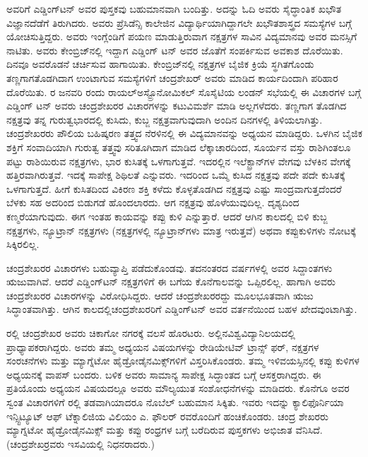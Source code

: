 ಅವರಿಗೆ ಎಡ್ಡಿಂಗ್‍ಟನ್ ಅವರ ಪುಸ್ತಕವು ಬಹುಮಾನವಾಗಿ ಬಂದಿತ್ತು. ಅದನ್ನು ಓದಿ ಅವರು ಸೈದ್ಧಾಂತಿಕ ಖಭೌತ ವಿಜ್ಞಾನದೆಡೆಗೆ ತಿರುಗಿದರು. ಅವರು ಪ್ರೆಸಿಡೆನ್ಸಿ ಕಾಲೇಜಿನ ವಿದ್ಯಾರ್ಥಿಯಾಗಿ\-ದ್ದಾಗಲೇ ಖಭೌತಶಾಸ್ತ್ರದ ಸಮಸ್ಯೆಗಳ ಬಗ್ಗೆ ಯೋಚಿಸುತ್ತಿದ್ದರು. ಅವರು ಇಂಗ್ಲೆಂಡಿಗೆ ಪಯಣ ಮಾಡುತ್ತಿರುವಾಗ ನಕ್ಷತ್ರಗಳ ಸಾವಿನ ವಿದ್ಯಮಾನವು ಅವರ ಮನಸ್ಸಿಗೆ ನಾಟಿತು. ಅವರು ಕೇಂಬ್ರಿಜ್‍ನಲ್ಲಿ ಇದ್ದಾಗ ಎಡ್ಡಿಂಗ್ ಟನ್ ಅವರ ಜೊತೆಗೆ ಸಂಪರ್ಕಿಸುವ ಅವಕಾಶ ದೊರೆಯಿತು. ದಿನವೂ ಅವರೊಡನೆ ಚರ್ಚಿಸುವ ಹಾಗಾಯಿತು. ಕೇಂಬ್ರಿಜ್‍ನಲ್ಲಿ ನಕ್ಷತ್ರಗಳ ಬೈಜಿಕ ಕ್ರಿಯೆ ಸ್ಥಗಿತಗೊಂಡು ತಣ್ಣಗಾಗತೊಡಗಿದಾಗ ಉಂಟಾಗುವ ಸಮಸ್ಯೆಗಳಿಗೆ ಚಂದ್ರಶೇಖರ್ ಅವರು ಮಾಡಿದ ಕಾರ್ಯದಿಂದಾಗಿ ಪರಿಹಾರ ದೊರೆಯಿತು. ರ ಜನವರಿ ರಂದು ರಾಯಲ್\break ಅಸ್ಟ್ರೊನೋಮಿಕಲ್ ಸೊಸೈಟಿಯ ಲಂಡನ್ ಸಭೆಯಲ್ಲಿ ಈ ವಿಚಾರಗಳ ಬಗ್ಗೆ ಎಡ್ಡಿಂಗ್ ಟನ್ ಅವರು ಚಂದ್ರಶೇಖರರ ವಿಚಾರಗಳನ್ನು ಕಟುವಿಮರ್ಶೆ ಮಾಡಿ ಅಲ್ಲಗಳೆದರು. ತಣ್ಣಗಾಗ ತೊಡಗಿದ ನಕ್ಷತ್ರವು ತನ್ನ ಗುರುತ್ವಭಾರದಲ್ಲಿ ಕುಸಿದು, ಕುಬ್ಜ ನಕ್ಷತ್ರವಾಗುವುದಾಗಿ ಅಂದಿನ ದಿನಗಳಲ್ಲಿ ತಿಳಿಯಲಾಗಿತ್ತು. ಚಂದ್ರಶೇಖರರು ಪೌಲಿಯ ಬಹಿಷ್ಕರಣ ತತ್ತ್ವದ ನೆರಳಿನಲ್ಲಿ ಈ ವಿದ್ಯಮಾನವನ್ನು ಅಧ್ಯಯನ ಮಾಡಿದ್ದರು. ಒಳಗಿನ ಬೈಜಿಕ ಶಕ್ತಿಗೆ ಸಂವಾದಿಯಾಗಿ ಗುರುತ್ವ ತತ್ತ್ವವು ಸರಿತೂಗಿದಾಗ ಮಾಡಿದ ಲೆಕ್ಕಾಚಾರದಿಂದ, ಸೂರ್ಯನ ವಸ್ತು ರಾಶಿಗಿಂತಲೂ  ಪಟ್ಟು ರಾಶಿಯಿರುವ ನಕ್ಷತ್ರಗಳು, ಭಾರ ಕುಸಿತಕ್ಕೆ ಒಳಗಾಗುತ್ತವೆ. ಇದರಲ್ಲಿನ ಇಲೆಕ್ಟ್ರಾನ್‍ಗಳ ವೇಗವು ಬೆಳಕಿನ ವೇಗಕ್ಕೆ ಹತ್ತಿರವಾಗಿರುತ್ತವೆ. ಇದಕ್ಕೆ ಸಾಪೇಕ್ಷ ಶಿಥಿಲತೆ ಎನ್ನುವರು. ಇದರಿಂದ ಒಮ್ಮೆ ಕುಸಿದ ನಕ್ಷತ್ರವು ಪದೇ ಪದೇ ಕುಸಿತಕ್ಕೆ ಒಳಗಾಗುತ್ತದೆ. ಹೀಗೆ ಕುಸಿತದಿಂದ ವಿಕಿರಣ ಶಕ್ತಿ ಕಳೆದು ಕೊಳ್ಳತೊಡಗಿದ ನಕ್ಷತ್ರವು ಎಷ್ಟು ಸಾಂದ್ರವಾಗುತ್ತದೆಂದರೆ ಬೆಳಕು ಸಹ ಅದರಿಂದ ಬಿಡುಗಡೆ ಹೊಂದಲಾರದು. ಆಗ ನಕ್ಷತ್ರವು ಹೊಳೆಯುವುದಿಲ್ಲ. ದೃಶ್ಯದಿಂದ ಕಣ್ಮರೆಯಾಗುವುದು. ಈಗ ಇಂತಹ ಕಾಯವನ್ನು ಕಪ್ಪು ಕುಳಿ ಎನ್ನುತ್ತಾರೆ. ಆದರೆ ಆಗಿನ ಕಾಲದಲ್ಲಿ ಬಿಳಿ ಕುಬ್ಜ ನಕ್ಷತ್ರಗಳು, ನ್ಯೂಟ್ರಾನ್ ನಕ್ಷತ್ರಗಳು (ನಕ್ಷತ್ರಗಳಲ್ಲಿ ನ್ಯೂಟ್ರಾನ್‍ಗಳು ಮಾತ್ರ ಇರುತ್ತವೆ) ಅಥವಾ ಕಪ್ಪುಕುಳಿಗಳು ನೋಟಕ್ಕೆ ಸಿಕ್ಕಿರಲಿಲ್ಲ.

ಚಂದ್ರಶೇಖರರ ವಿಚಾರಗಳು ಬಹುವ್ಯಾಪ್ತಿ ಪಡೆದುಕೊಂಡವು. ತದನಂತರದ ವರ್ಷಗಳಲ್ಲಿ ಅವರ ಸಿದ್ದಾಂತಗಳು ಋಜುವಾಗಿವೆ. ಆದರೆ ಎಡ್ಡಿಂಗ್‍ಟನ್ ನಕ್ಷತ್ರಗಳಿಗೆ ಈ ಬಗೆಯ ಕೊನೆಗಾಲವನ್ನು ಒಪ್ಪಿರಲಿಲ್ಲ. ಹಾಗಾಗಿ ಅವರು ಚಂದ್ರಶೇಖರರ ವಿಚಾರಗಳನ್ನು ವಿರೋಧಿಸಿದ್ದರು. ಆದರೆ ಚಂದ್ರಶೇಖರರದ್ದು ಮೂಲಭೂತವಾಗಿ ಋಜು ಸಿದ್ಧಾಂತವಾಗಿತ್ತು. ಆಗಿನ ಕಾಲದಲ್ಲಿ\break ಚಂದ್ರಶೇಖರರಿಗೆ ಎಡ್ಡಿಂಗ್‍ಟನ್ ಅವರ ವರ್ತನೆಯಿಂದ ಬಹಳ ಖೇದವುಂಟಾಗಿತ್ತು.

ರಲ್ಲಿ ಚಂದ್ರಶೇಖರ ಅವರು ಚಿಕಾಗೋ ನಗರಕ್ಕೆ ವಲಸೆ ಹೊರಟರು. ಅಲ್ಲಿನ\break ವಿಶ್ವವಿದ್ಯಾನಿಲಯದಲ್ಲಿ ಪ್ರಾಧ್ಯಾಪಕರಾಗಿದ್ದರು. ಅವರು ತಮ್ಮ ಅಧ್ಯಯನ ವಿಷಯಗಳನ್ನು ರೇಡಿಯೇಟಿವ್ ಟ್ರಾನ್ಸ್ ಫರ್, ನಕ್ಷತ್ರಗಳ ಸಂರಚನೆಗಳು ಮತ್ತು ಮ್ಯಾಗ್ನೆಟೋ ಹೈಡ್ರೋಡೈನಮಿಕ್ಸ್‌ಗಳಿಗೆ ವಿಸ್ತರಿಸಿಕೊಂಡರು. ತಮ್ಮ ಇಳಿವಯಸ್ಸಿನಲ್ಲಿ ಕಪ್ಪು ಕುಳಿಗಳ ಅಧ್ಯಯನಕ್ಕೆ ವಾಪಸ್ ಬಂದರು. ಬಳಿಕ ಅವರು ಸಾಮಾನ್ಯ ಸಾಪೇಕ್ಷ ಸಿದ್ಧಾಂತದ ಬಗ್ಗೆ ಆಸಕ್ತರಾಗಿದ್ದರು. ಈ ಪ್ರತಿಯೊಂದು ಅಧ್ಯಯನ ವಿಷಯದಲ್ಲೂ ಅವರು ಮೌಲ್ಯಯುತ ಸಂಶೋಧನೆಗಳನ್ನು ಮಾಡಿದರು. ಕೊನೆಗೂ ಅವರ ಸ್ವಂತ ವಿಚಾರಗಳಿಗೆ ರಲ್ಲಿ ತಡವಾಗಿಯಾದರೂ ನೊಬೆಲ್ ಬಹುಮಾನ ಸಿಕ್ಕಿತು. ಇವರು ಇದನ್ನು ಕ್ಯಾಲಿಫೊರ್ನಿಯಾ ಇನ್ಸ್ಟಿಟ್ಯೂಟ್ ಆಫ್ ಟೆಕ್ನಾಲಿಜಿಯ ವಿಲಿಯಂ ಎ. ಫೌಲರ್ ರವರೊಂದಿಗೆ ಹಂಚಿಕೊಂಡರು. ಚಂದ್ರ ಶೇಖರರು ಮ್ಯಾಗ್ನಟೋ ಹೈಡ್ರೋಡೈನಮಿಕ್ಸ್ ಮತ್ತು ಕಪ್ಪು ರಂಧ್ರಗಳ ಬಗ್ಗೆ ಬರೆದಿರುವ ಪುಸ್ತಕಗಳು ಅಭಿಜಾತ ವೆನಿಸಿದೆ. (ಚಂದ್ರಶೇಖರ್‍ರವರು  ಇಸವಿಯಲ್ಲಿ ನಿಧನರಾದರು.)

